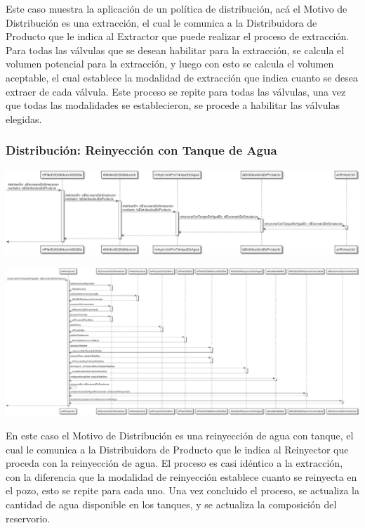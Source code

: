 \documentclass[10pt,a4paper]{article}
\begin{document}
Este caso muestra la aplicación de un política de distribución, acá el Motivo de Distribución es una extracción, el cual le comunica a la Distribuidora de Producto que le indica al Extractor que puede realizar el proceso de extracción. Para todas las válvulas que se desean habilitar para la extracción, se calcula el volumen potencial para la extracción, y luego con esto se calcula el volumen aceptable, el cual establece la modalidad de extracción que indica cuanto se desea extraer de cada válvula. Este proceso se repite para todas las válvulas, una vez que todas las modalidades se establecieron, se procede a habilitar las válvulas elegidas.

\subsubsection{Distribución: Reinyección con Tanque de Agua}

\centerline{\includegraphics[scale=0.35]{images/secuenciaDistribucionMotivoAgua1.png}}
\vspace{0.25cm}
\centerline{\includegraphics[scale=0.2]{images/secuenciaDistribucionMotivoAgua2.png}}

En este caso el Motivo de Distribución es una reinyección de agua con tanque, el cual le comunica a la Distribuidora de Producto que le indica al Reinyector que proceda con la reinyección de agua. El proceso es casi idéntico a la extracción, con la diferencia que la modalidad de reinyección establece cuanto se reinyecta en el pozo, esto se repite para cada uno. Una vez concluido el proceso, se actualiza la cantidad de agua disponible en los tanques, y se actualiza la composición del reservorio.
\end{document}
